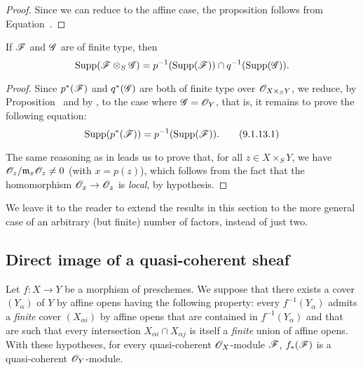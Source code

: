 \begin{proof}
Since we can reduce to the affine case, the proposition follows from
Equation~.
\end{proof}

\begin{corollary}[9.1.13]
\label{I.9.1.13}
If $\mathscr{F}$ and $\mathscr{G}$ are of finite type, then
\[
  \operatorname{Supp}(\mathscr{F}\otimes_S\mathscr{G})=p^{-1}(\operatorname{Supp}(\mathscr{F}))\cap q^{-1}(\operatorname{Supp}(\mathscr{G})).
\]
\end{corollary}

\begin{proof}
Since $p^*(\mathscr{F})$ and $q^*(\mathscr{G})$ are both of finite type over
$\mathscr{O}_{X\times_S Y}$, we reduce, by Proposition~ and
by , to the case where $\mathscr{G}=\mathscr{O}_Y$, that
is, it remains to prove the following equation:
\[
\label{I.9.1.13.1}
  \operatorname{Supp}(p^*(\mathscr{F}))=p^{-1}(\operatorname{Supp}(\mathscr{F})).
  \tag{9.1.13.1}
\]

The same reasoning as in  leads us to prove that, for all
$z\in X\times_S Y$, we have $\mathscr{O}_z/\mathfrak{m}_x\mathscr{O}_z\neq0$ (with $x=p(z)$),
which follows from the fact that the homomorphism $\sh{O}_x\to\sh{O}_z$ is \emph{local},
by hypothesis.
\end{proof}

We leave it to the reader to extend the results in this section to the more
general case of an arbitrary (but finite) number of factors, instead of just two.

\subsection{Direct image of a quasi-coherent sheaf}
\label{subsection:I.9.2}

\begin{proposition}[9.2.1]
\label{I.9.2.1}
Let $f:X\to Y$ be a morphism of
preschemes. We suppose that there exists a cover $(Y_\alpha)$ of $Y$ by affine
opens having the following property: every $f^{-1}(Y_\alpha)$ admits a
\emph{finite} cover $(X_{\alpha i})$ by affine opens that are contained in
$f^{-1}(Y_\alpha)$ and that are such that every intersection $X_{\alpha i}\cap X_{\alpha j}$
is itself a \emph{finite} union of affine opens. With these hypotheses, for
every quasi-coherent $\mathscr{O}_X$-module $\mathscr{F}$, $f_*(\mathscr{F})$ is a
quasi-coherent $\mathscr{O}_Y$-module.
\end{proposition}

